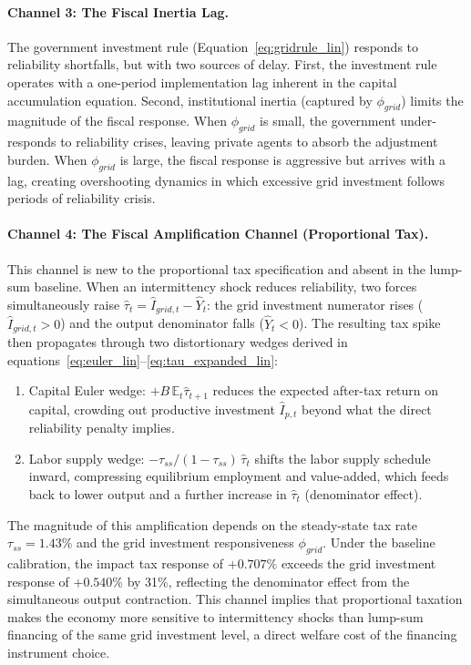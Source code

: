 \documentclass[12pt, a4paper]{article}
\begin{document}
	\paragraph{Channel 3: The Fiscal Inertia Lag.}
	The government investment rule (Equation~\ref{eq:gridrule_lin}) responds to reliability shortfalls, but with two sources of delay. First, the investment rule operates with a one-period implementation lag inherent in the capital accumulation equation. Second, institutional inertia (captured by $\phi_{grid}$) limits the magnitude of the fiscal response. When $\phi_{grid}$ is small, the government under-responds to reliability crises, leaving private agents to absorb the adjustment burden. When $\phi_{grid}$ is large, the fiscal response is aggressive but arrives with a lag, creating overshooting dynamics in which excessive grid investment follows periods of reliability crisis.
	
	\paragraph{Channel 4: The Fiscal Amplification Channel (Proportional Tax).}
	This channel is new to the proportional tax specification and absent in the lump-sum baseline. When an intermittency shock reduces reliability, two forces simultaneously raise $\hat{\tau}_t = \hat{I}_{grid,t} - \hat{Y}_t$: the grid investment numerator rises ($\hat{I}_{grid,t} > 0$) and the output denominator falls ($\hat{Y}_t < 0$). The resulting tax spike then propagates through two distortionary wedges derived in equations~\eqref{eq:euler_lin}--\eqref{eq:tau_expanded_lin}:
	
	\begin{enumerate}
		\item Capital Euler wedge: $+B\,\mathbb{E}_t\hat{\tau}_{t+1}$ reduces the expected after-tax return on capital, crowding out productive investment $\hat{I}_{p,t}$ beyond what the direct reliability penalty implies.
		\item Labor supply wedge: $-\tau_{ss}/(1-\tau_{ss})\,\hat{\tau}_t$ shifts the labor supply schedule inward, compressing equilibrium employment and value-added, which feeds back to lower output and a further increase in $\hat{\tau}_t$ (denominator effect).
	\end{enumerate}
	
	The magnitude of this amplification depends on the steady-state tax rate $\tau_{ss} = 1.43\%$ and the grid investment responsiveness $\phi_{grid}$. Under the baseline calibration, the impact tax response of $+0.707\%$ exceeds the grid investment response of $+0.540\%$ by 31\%, reflecting the denominator effect from the simultaneous output contraction. This channel implies that proportional taxation makes the economy more sensitive to intermittency shocks than lump-sum financing of the same grid investment level, a direct welfare cost of the financing instrument choice.
	
\end{document}
